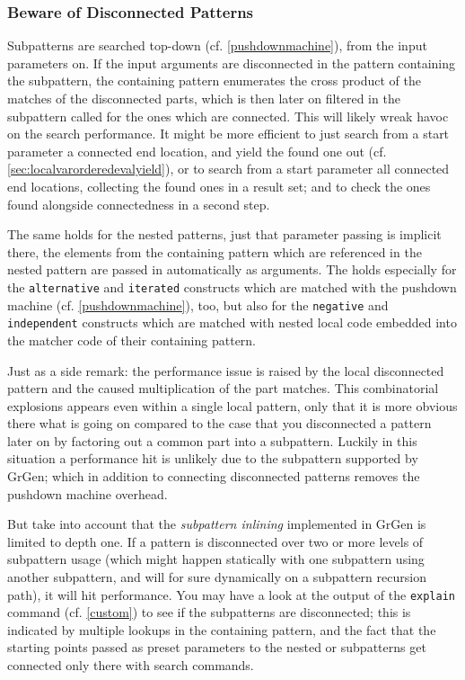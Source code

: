 \subsubsection*{Beware of Disconnected Patterns}
Subpatterns are searched top-down (cf. \ref{pushdownmachine}), from the input parameters on.
If the input arguments are disconnected in the pattern containing the subpattern, the containing pattern enumerates the cross product of the matches of the disconnected parts, which is then later on filtered in the subpattern called for the ones which are connected.
This will likely wreak havoc on the search performance.
It might be more efficient to just search from a start parameter a connected end location, and yield the found one out (cf. \ref{sec:localvarorderedevalyield}), or to search from a start parameter all connected end locations, collecting the found ones in a result set; and to check the ones found alongside connectedness in a second step.

The same holds for the nested patterns, just that parameter passing is implicit there, the elements from the containing pattern which are referenced in the nested pattern are passed in automatically as arguments.
The holds especially for the \texttt{alternative} and \texttt{iterated} constructs which are matched with the pushdown machine (cf. \ref{pushdownmachine}), too, but also for the \texttt{negative} and \texttt{independent} constructs which are matched with nested local code embedded into the matcher code of their containing pattern.

Just as a side remark: the performance issue is raised by the local disconnected pattern and the caused multiplication of the part matches.
This combinatorial explosions appears even within a single local pattern, only that it is more obvious there what is going on compared to the case that you disconnected a pattern later on by factoring out a common part into a subpattern.
Luckily in this situation a performance hit is unlikely due to the subpattern  supported by GrGen; which in addition to connecting disconnected patterns removes the pushdown machine overhead.

But take into account that the \emph{subpattern inlining} implemented in GrGen is limited to depth one.
If a pattern is disconnected over two or more levels of subpattern usage (which might happen statically with one subpattern using another subpattern, and will for sure dynamically on a subpattern recursion path), it will hit performance.
You may have a look at the output of the \texttt{explain} command (cf. \ref{custom}) to see  if the subpatterns are disconnected; this is indicated by multiple lookups in the containing pattern, and the fact that the starting points passed as preset parameters to the nested or subpatterns get connected only there with search commands.

